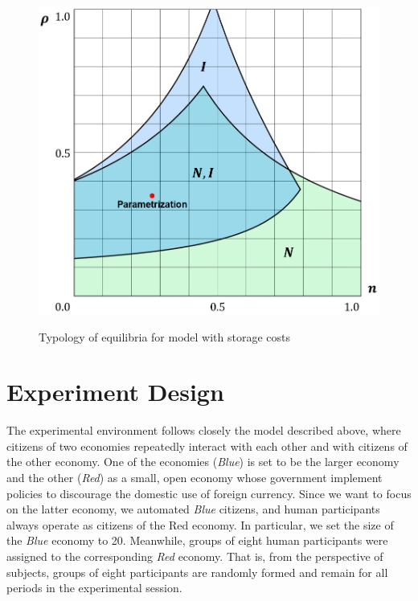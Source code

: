 \begin{figure}
    
    \caption{Typology of equilibria for model with storage costs}
    \centering
    \includegraphics[scale=0.55]{Treatment2-A.PNG}
     \label{fig:im1}

\end{figure}


\section{Experiment Design} 
\label{Experiment}
The experimental environment follows closely the model described above, where citizens of two economies repeatedly interact with each other and with citizens of the other economy. 
One of the economies (\textit{Blue}) is set to be the larger economy and the other (\textit{Red}) as a small, open economy whose government implement policies to discourage the domestic use of foreign currency. Since we want to focus on the latter economy, we automated \textit{Blue} citizens, and human participants always operate as citizens of the Red economy.  In particular, we set the size of the \textit{Blue} economy to 20. Meanwhile, groups of eight human participants were assigned to the corresponding \textit{Red} economy. That is, from the perspective of subjects, groups of eight participants are randomly formed and remain for all periods in the experimental session. 

